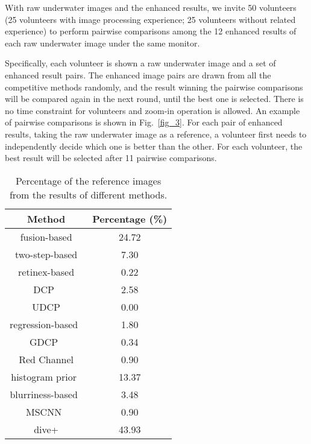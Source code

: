 \documentclass[journal]{IEEEtran}
\begin{document}
With raw underwater images and the enhanced results, we invite 50 volunteers (25 volunteers with image processing experience; 25 volunteers without related experience) to perform pairwise comparisons among the 12 enhanced results of each raw underwater image under the same monitor.




Specifically, each volunteer is shown a raw underwater image and a set of enhanced result pairs. The enhanced image pairs are drawn from all the competitive methods randomly, and the result winning the pairwise comparisons will be compared again in the next round, until the best one is selected. There is no time constraint for volunteers and zoom-in operation is allowed. An example of pairwise comparisons is shown in Fig.~\ref{fig_3}. For each pair of enhanced results, taking the raw underwater image as a reference, a volunteer first needs to independently decide which one is better than the other. For each volunteer, the best result will be selected after 11 pairwise comparisons.


\begin{table}[htbp]
\caption{Percentage of the reference images from the results of different methods. }
 \centering
\begin{tabular}{c|c}
  \hline
  \textbf{Method} & \textbf{Percentage (\%)} \\
  \hline
  fusion-based \cite{Ancuti2012} & \textcolor[rgb]{0.00,0.07,1.00}{24.72} \\
  two-step-based \cite{Fu2017} & 7.30  \\
  retinex-based \cite{Fu2014} & 0.22 \\
  DCP~\cite{He2011}  & 2.58 \\
  UDCP \cite{Drews2016} & 0.00 \\
  regression-based~\cite{Li2017prl} & 1.80\\
  GDCP~\cite{Peng2018} & 0.34 \\
  Red Channel \cite{Galdran2015} & 0.90 \\
  histogram prior~\cite{Li2016} & 13.37 \\
  blurriness-based~\cite{Peng2017} & 3.48 \\
  MSCNN~\cite{Ren2016} & 0.90\\
  dive+ &  \textcolor[rgb]{1.00,0.00,0.00}{43.93}\\
  \hline
\end{tabular}
\vspace{\baselineskip}
\label{table_1}
\end{table}
\end{document}
